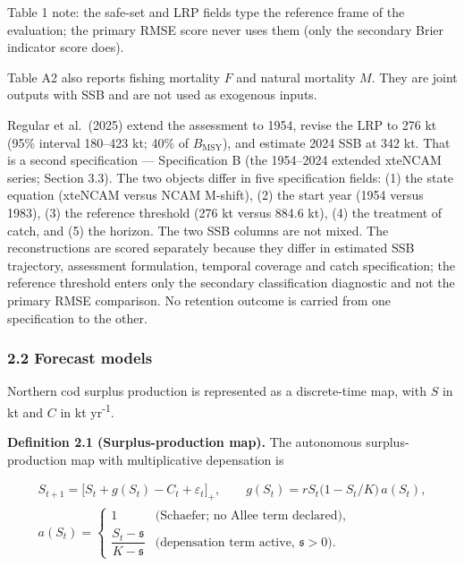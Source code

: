 \documentclass[11pt]{article}
\begin{document}
Table 1 note: the safe-set and LRP fields type the reference frame of
the evaluation; the primary RMSE score never uses them (only the
secondary Brier indicator score does).

Table A2 also reports fishing mortality \(F\) and natural mortality
\(M\). They are joint outputs with SSB and are not used as exogenous
inputs.

Regular et al.~(2025) extend the assessment to 1954, revise the LRP to
276 kt (95\% interval 180--423 kt; 40\% of \(B_{\mathrm{MSY}}\)), and
estimate 2024 SSB at 342 kt. That is a second specification ---
Specification B (the 1954--2024 extended xteNCAM series; Section 3.3).
The two objects differ in five specification fields: (1) the state
equation (xteNCAM versus NCAM M-shift), (2) the start year (1954 versus
1983), (3) the reference threshold (276 kt versus 884.6 kt), (4) the
treatment of catch, and (5) the horizon.
The two SSB columns are not mixed. The reconstructions are scored separately because they differ in
estimated SSB trajectory, assessment formulation, temporal coverage and
catch specification; the reference threshold enters only the secondary
classification diagnostic and not the primary RMSE comparison. No
retention outcome is carried from one specification to the other.

\subsubsection{2.2 Forecast models}\label{cod-forecast-models}

Northern cod surplus production is represented as a discrete-time map,
with \(S\) in kt and \(C\) in kt yr\textsuperscript{-1}.

\textbf{Definition 2.1 (Surplus-production map).} The autonomous
surplus-production map with multiplicative depensation is

\[
\begin{gathered}
S_{t+1}=\bigl[S_t+g(S_t)-C_t+\varepsilon_t\bigr]_+,
\qquad
g(S_t)=rS_t\bigl(1-S_t/K\bigr)\,a(S_t),
\\
a(S_t)=
\begin{cases}
1 & \text{(Schaefer; no Allee term declared)},\\[2pt]
\dfrac{S_t-\mathfrak s}{K-\mathfrak s} & \text{(depensation term active, $\mathfrak s>0$)}.
\end{cases}
\end{gathered}
\]
\end{document}
